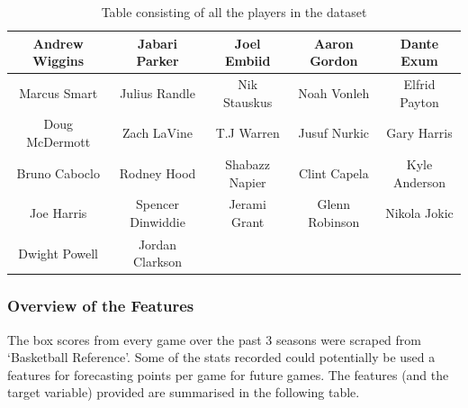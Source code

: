 \documentclass[a4paper,11pt,twoside]{article}
\begin{document}
\vspace{5mm}
\begin{table} [h!]
\begin{center}
\begin{tabular}{ ccccc } 
 \hline
Andrew Wiggins & Jabari Parker & Joel Embiid & Aaron  Gordon& Dante Exum \\ 
 \hline
Marcus Smart & Julius Randle & Nik Stauskus & Noah Vonleh & Elfrid Payton \\ 
 \hline
 Doug McDermott & Zach LaVine & T.J Warren & Jusuf Nurkic & Gary Harris\\
 \hline
 Bruno Caboclo & Rodney Hood & Shabazz Napier & Clint Capela & Kyle Anderson\\
 \hline 
 Joe Harris & Spencer Dinwiddie & Jerami Grant & Glenn Robinson & Nikola Jokic\\
 \hline
  Dwight Powell & Jordan Clarkson\\
\hline
\end{tabular}
\caption{Table consisting of all the players in the dataset}
\end{center}
\end{table}

 \subsubsection{Overview of the Features}
The box scores from every game over the past 3 seasons  were scraped from `Basketball Reference'. Some of the stats recorded could potentially be used a features for forecasting points per game for future games. The features (and the target variable) provided are summarised in the following table. 
\end{document}
